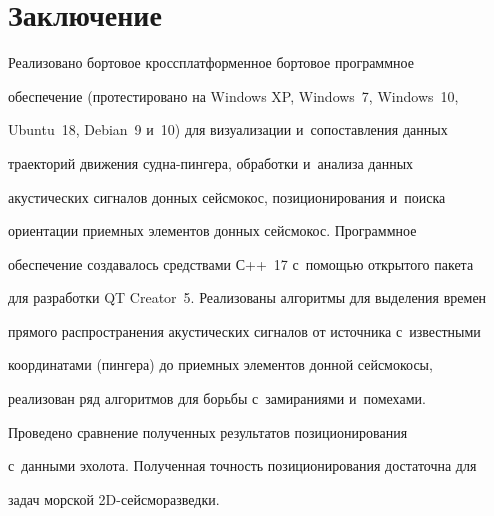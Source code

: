 \section{Заключение}



    Реализовано бортовое кроссплатформенное бортовое программное 

обеспечение (протестировано на Windows XP, Windows~7, Windows~10, 

Ubuntu~18, Debian~9 и~10) для визуализации и~сопоставления данных 

траекторий движения суд\-на-пин\-ге\-ра, обработки и~анализа данных 

акустических сигналов донных сейсмокос, позиционирования и~поиска 

ориентации приемных элементов донных сейсмокос. Программное 

обеспечение создавалось средствами С++~17 с~по\-мощью открытого пакета 

для разработки QT Creator~5. Реализованы алгоритмы для выделения времен 

прямого распространения акустических сигналов от источника с~известными 

координатами (пингера) до приемных элементов донной сейсмокосы, 

реализован ряд алгоритмов для борьбы с~замираниями и~помехами. 

Проведено сравнение полученных результатов позиционирования 

с~данными эхолота. Полученная точность позиционирования достаточна для 

задач морской 2D-сейс\-мо\-раз\-ведки.



